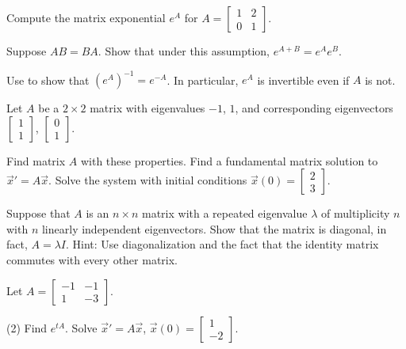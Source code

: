 \begin{exercise}
Compute the matrix exponential $e^A$ for
$A = \left[ \begin{smallmatrix} 1 & 2 \\ 0 & 1 \end{smallmatrix} \right]$.
\end{exercise}

\begin{exercise}[challenging] \label{matexp:explawex}
Suppose $AB = BA$.  Show that under this assumption, $e^{A+B} = e^A e^B$.
\end{exercise}

\begin{exercise} \label{matexp:expinvex}
Use 
to show that ${(e^{A})}^{-1} = e^{-A}$.  In particular,
$e^A$ is invertible even if $A$ is not.
\end{exercise}

\begin{exercise}
Let $A$ be a $2 \times 2$ matrix with eigenvalues $-1$, $1$, and
corresponding eigenvectors
$\left[ \begin{smallmatrix}
1 \\
1
\end{smallmatrix} \right]$,
$\left[ \begin{smallmatrix}
0 \\
1
\end{smallmatrix} \right]$.
\begin{tasks}
\task Find matrix $A$ with these properties.
\task Find a fundamental matrix solution to ${\vec{x}}' = A \vec{x}$.
\task Solve the system with initial conditions $\vec{x}(0) =
\left[ \begin{smallmatrix}
2 \\
3
\end{smallmatrix} \right]$.
\end{tasks}
\end{exercise}

\begin{exercise}
Suppose that $A$ is an $n \times n$ matrix with a repeated eigenvalue
$\lambda$ of multiplicity $n$ with
$n$ linearly independent eigenvectors.  Show that
the matrix is diagonal, in fact, $A = \lambda I$.  Hint: Use
diagonalization and the fact that the identity matrix commutes with every
other matrix.
\end{exercise}

\begin{exercise}
Let $A = \left[ \begin{smallmatrix}
-1 & -1 \\
1 & -3
\end{smallmatrix} \right]$.
\begin{tasks}(2)
\task Find $e^{tA}$.
\task Solve
${\vec{x}}' = A \vec{x}$, $\vec{x}(0) =
\left[ \begin{smallmatrix}
1 \\
-2
\end{smallmatrix} \right]$.
\end{tasks}
\end{exercise}

